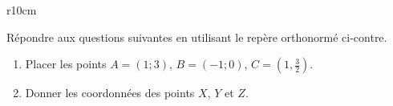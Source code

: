 
\begin{exercice}\label{exoSeconde-0002}

    \begin{wrapfigure}[30]{r}{10cm}
   \vspace{-1cm}        %
   \centering
   
\end{wrapfigure}
    Répondre aux questions suivantes en utilisant le repère orthonormé ci-contre.

    \begin{enumerate}
        \item
            Placer les points \( A=(1;3)\), \( B=(-1;0)\), \( C=(1,\frac{ 3 }{2})\).
        \item
            Donner les coordonnées des points \( X\), \( Y\) et \( Z\).
    \end{enumerate}
    \vspace{1cm}

\end{exercice}
